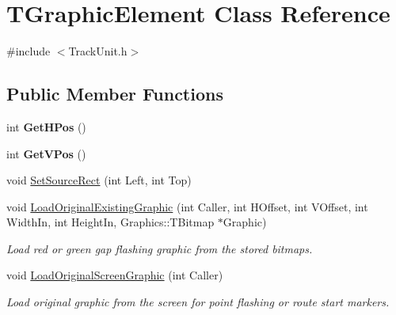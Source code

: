 \hypertarget{class_t_graphic_element}{}\section{T\+Graphic\+Element Class Reference}
\label{class_t_graphic_element}


{\ttfamily \#include $<$Track\+Unit.\+h$>$}

\subsection*{Public Member Functions}
\begin{DoxyCompactItemize}
\item 
\mbox{\label{class_t_graphic_element_aaf109e208515c9b9aaad753d829d25e9}} 
int {\bfseries Get\+H\+Pos} ()
\item 
\mbox{\label{class_t_graphic_element_ad2780e85ae1e401bfbb6a7c37b15bea8}} 
int {\bfseries Get\+V\+Pos} ()
\item 
void \mbox{\hyperlink{class_t_graphic_element_adffdc9f9c4a5fff5cbeab6b5a027dad9}{Set\+Source\+Rect}} (int Left, int Top)
\item 
\mbox{\label{class_t_graphic_element_a6c3759e5c5a639ef98c3470363c48988}} 
void \mbox{\hyperlink{class_t_graphic_element_a6c3759e5c5a639ef98c3470363c48988}{Load\+Original\+Existing\+Graphic}} (int Caller, int H\+Offset, int V\+Offset, int Width\+In, int Height\+In, Graphics\+::\+T\+Bitmap $\ast$Graphic)
\begin{DoxyCompactList}\small\item\em Load red or green gap flashing graphic from the stored bitmaps. \end{DoxyCompactList}\item 
\mbox{\label{class_t_graphic_element_ac12f60cb52eefdc86eaa504419eb138d}} 
void \mbox{\hyperlink{class_t_graphic_element_ac12f60cb52eefdc86eaa504419eb138d}{Load\+Original\+Screen\+Graphic}} (int Caller)
\begin{DoxyCompactList}\small\item\em Load original graphic from the screen for point flashing or route start markers. \end{DoxyCompactList}\item 

\end{DoxyCompactItemize}
